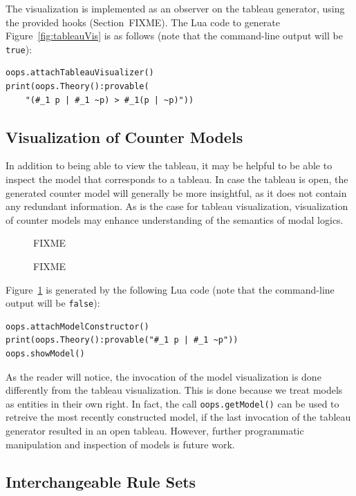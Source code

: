 The visualization is implemented as an observer on the tableau generator,
using the provided hooks (Section~FIXME). The Lua code to generate
Figure~\ref{fig:tableauVis} is as follows (note that the command-line output
will be \lstinline!true!):

\lstset{language=lua, basicstyle=\small, stringstyle=\upshape,
stringstyle=\ttfamily, showstringspaces=false, tabsize=4}
\begin{lstlisting}
oops.attachTableauVisualizer()
print(oops.Theory():provable(
	"(#_1 p | #_1 ~p) > #_1(p | ~p)"))
\end{lstlisting}

\subsection{Visualization of Counter Models}

In addition to being able to view the tableau, it may be helpful to be able to
inspect the model that corresponds to a tableau. In case the tableau is open,
the generated counter model will generally be more insightful, as it does not
contain any redundant information. As is the case for tableau visualization,
visualization of counter models may enhance understanding of the semantics of
modal logics.

\begin{figure}
\centering
FIXME
\caption{FIXME}
\label{fig:modelVis}
\end{figure}

Figure~\ref{fig:modelVis} is generated by the following Lua code (note that
the command-line output will be \lstinline!false!):
\begin{lstlisting}
oops.attachModelConstructor()
print(oops.Theory():provable("#_1 p | #_1 ~p"))
oops.showModel() 
\end{lstlisting}
As the reader will notice, the invocation of the model visualization is done
differently from the tableau visualization. This is done because we treat
models as entities in their own right. In fact, the call
\lstinline!oops.getModel()!  can be used to retreive the most recently
constructed model, if the last invocation of the tableau generator resulted in
an open tableau. However, further programmatic manipulation and inspection of
models is future work.

\subsection{Interchangeable Rule Sets}

